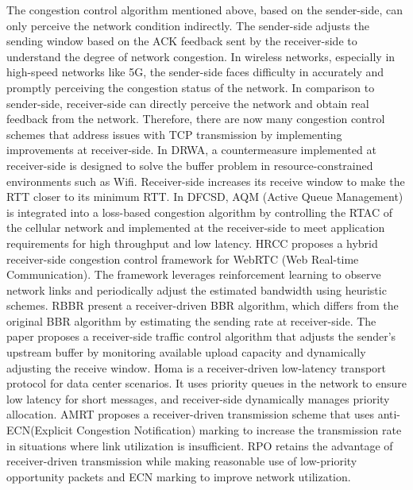 The congestion control algorithm mentioned above, based on the sender-side, can only perceive the network condition indirectly. The sender-side adjusts the sending window based on the ACK feedback sent by the receiver-side to understand the degree of network congestion. In wireless networks, especially in high-speed networks like 5G, the sender-side faces difficulty in accurately and promptly perceiving the congestion status of the network. In comparison to sender-side, receiver-side can directly perceive the network and obtain real feedback from the network. Therefore, there are now many congestion control schemes that address issues with TCP transmission by implementing improvements at receiver-side. In DRWA\cite{a25:H}, a countermeasure implemented at receiver-side is designed to solve the buffer problem in resource-constrained environments such as Wifi. Receiver-side increases its receive window to make the RTT closer to its minimum RTT. In DFCSD\cite{a26:P}, AQM (Active Queue Management) is integrated into a loss-based congestion algorithm by controlling the RTAC\cite{a27:H} of the cellular network and implemented at the receiver-side to meet application requirements for high throughput and low latency. HRCC\cite{a37:B} proposes a hybrid receiver-side congestion control framework for WebRTC (Web Real-time Communication). The framework leverages reinforcement learning to observe network links and periodically adjust the estimated bandwidth using heuristic schemes. RBBR\cite{a38:H} present a receiver-driven BBR algorithm, which differs from the original BBR algorithm by estimating the sending rate at receiver-side. The paper\cite{a64:Y} proposes a receiver-side traffic control algorithm that adjusts the sender's upstream buffer by monitoring available upload capacity and dynamically adjusting the receive window. Homa\cite{a39:B} is a receiver-driven low-latency transport protocol for data center scenarios. It uses priority queues in the network to ensure low latency for short messages, and receiver-side dynamically manages priority allocation. AMRT\cite{a40:J} proposes a receiver-driven transmission scheme that uses anti-ECN(Explicit Congestion Notification) marking to increase the transmission rate in situations where link utilization is insufficient. RPO\cite{a41:J} retains the advantage of receiver-driven transmission while making reasonable use of low-priority opportunity packets and ECN marking to improve network utilization.

